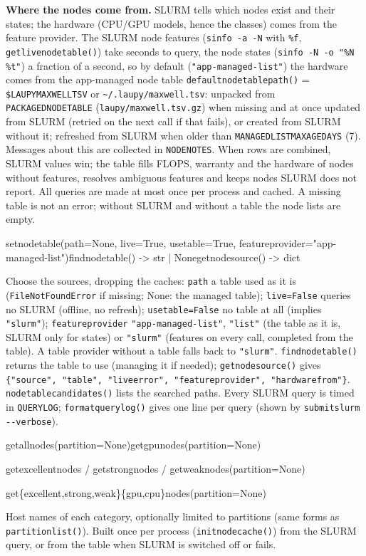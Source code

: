 \documentclass[11pt,a4paper]{article}
\newcommand{\api}[1]{%
  \par\medskip
  \begin{tcolorbox}[colback=sigbg, colframe=sigbg, boxrule=0pt, arc=1pt, left=4pt, right=4pt, top=2pt, bottom=2pt, breakable]
  \raggedright\ttfamily\small #1
  \end{tcolorbox}\nopagebreak\vspace{-4pt}%
}
\DeclareRobustCommand{\_}{\textunderscore\allowbreak}
\newcommand{\cmd}[1]{\texttt{#1}}
\begin{document}
\textbf{Where the nodes come from.} SLURM tells which nodes exist and their states; the hardware
(CPU/GPU models, hence the classes) comes from the feature provider. The SLURM node features
(\cmd{sinfo -a -N} with \cmd{\%f}, \cmd{get\_live\_node\_table()}) take seconds to query, the node
states (\cmd{sinfo -N -o "\%N \%t"}) a fraction of a second, so by default
(\cmd{"app-managed-list"}) the hardware comes from the app-managed node table
\cmd{default\_node\_table\_path()} = \cmd{\$LAUPY\_MAXWELL\_TSV} or \cmd{\textasciitilde/.laupy/maxwell.tsv}:
unpacked from \cmd{PACKAGED\_NODE\_TABLE} (\cmd{laupy/maxwell.tsv.gz}) when missing and at once
updated from SLURM (retried on the next call if that fails), or created from SLURM without it; refreshed from SLURM when older than \cmd{MANAGED\_LIST\_MAX\_AGE\_DAYS} (7).
Messages about this are collected in \cmd{NODE\_NOTES}. When rows are combined, SLURM values win;
the table fills FLOPS, warranty and the hardware of nodes without features, resolves ambiguous
features and keeps nodes SLURM does not report. All queries are made at most once per process and
cached. A missing table is not an error; without SLURM and without a table the node lists are empty.

\api{set\_node\_table(path=None, live=True, use\_table=True, feature\_provider="app-managed-list")\quad find\_node\_table() -> str | None\quad get\_node\_source() -> dict}
Choose the sources, dropping the caches: \cmd{path} a table used as it is (\cmd{FileNotFoundError}
if missing; None: the managed table); \cmd{live=False} queries no SLURM (offline, no refresh);
\cmd{use\_table=False} no table at all (implies \cmd{"slurm"}); \cmd{feature\_provider}
\cmd{"app-managed-list"}, \cmd{"list"} (the table as it is, SLURM only for states) or \cmd{"slurm"}
(features on every call, completed from the table). A table provider without a table falls back
to \cmd{"slurm"}. \cmd{find\_node\_table()} returns the table to use (managing it if needed);
\cmd{get\_node\_source()} gives \cmd{\{"source", "table", "live\_error", "feature\_provider",
"hardware\_from"\}}. \cmd{node\_table\_candidates()}
lists the searched paths. Every SLURM query is timed in \cmd{QUERY\_LOG};
\cmd{format\_query\_log()} gives one line per query (shown by \cmd{submitslurm -{}-verbose}).

\api{get\_all\_nodes(partition=None)\quad get\_gpu\_nodes(partition=None)}
\api{get\_excellent\_nodes / get\_strong\_nodes / get\_weak\_nodes(partition=None)}
\api{get\_\{excellent,strong,weak\}\_\{gpu,cpu\}\_nodes(partition=None)}
Host names of each category, optionally limited to partitions (same forms as
\cmd{partition\_list()}). Built once per process (\cmd{init\_node\_cache()}) from the SLURM query,
or from the table when SLURM is switched off or fails.
\end{document}
